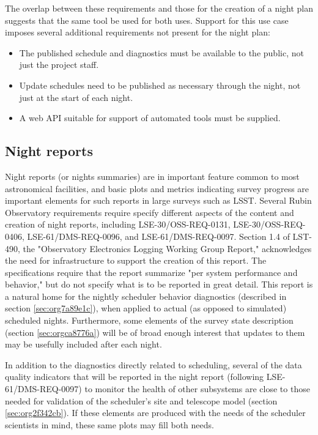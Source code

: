 The overlap between these requirements and those for the creation of a night plan suggests that the same tool be used for both uses. 
Support for this use case imposes several additional requirements not present for the night plan:
\begin{itemize}
\item The published schedule and diagnostics must be available to the public, not just the project staff.
\item Update schedules need to be published as necessary through the night, not just at the start of each night.
\item A web API suitable for support of automated tools must be supplied.
\end{itemize}

\subsection{Night reports}
\label{sec:orgcb68058}
Night reports (or nights summaries) are in important feature common to most astronomical facilities, and basic plots and metrics indicating survey progress are important elements for such reports in large surveys such as LSST.
Several Rubin Observatory requirements require specify different aspects of the content and creation of night reports, including LSE-30/OSS-REQ-0131, LSE-30/OSS-REQ-0406, LSE-61/DMS-REQ-0096, and LSE-61/DMS-REQ-0097. Section 1.4 of LST-490, the "Observatory Electronics Logging Working Group Report," acknowledges the need for infrastructure to support the creation of this report.
The specifications require that the report summarize "per system performance and behavior," but do not specify what is to be reported in great detail.
This report is a natural home for the nightly scheduler behavior diagnostics (described in section \ref{sec:org7a89e1c}), when applied to actual (as opposed to simulated) scheduled nights.
Furthermore, some elements of the survey state description (section \ref{sec:orgca8776a}) will be of broad enough interest that updates to them may be usefully included after each night.

In addition to the diagnostics directly related to scheduling, several of the data quality indicators that will be reported in the night report (following LSE-61/DMS-REQ-0097) to monitor the health of other subsystems are close to those needed for validation of the scheduler's site and telescope model (section \ref{sec:org2f342cb}). If these elements are produced with the needs of the scheduler scientists in mind, these same plots may fill both needs.


